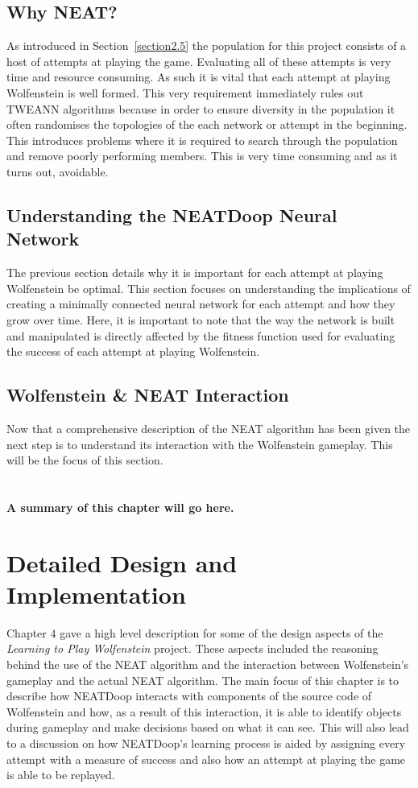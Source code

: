 \documentclass[]{Learning-to-Play-Wolfenstein-thesis}
\begin{document}
\section{Why NEAT?}
As introduced in Section~\ref{section2.5} the population for this project consists of a host of attempts at playing the game. Evaluating all of these attempts is very time and resource consuming. As such it is vital that each attempt at playing Wolfenstein is well formed. This very requirement immediately rules out TWEANN algorithms because in order to ensure diversity in the population it often randomises the topologies of the each network or attempt in the beginning. This introduces problems where it is required to search through the population and remove poorly performing members. This is very time consuming and as it turns out, avoidable.

\section{Understanding the NEATDoop Neural Network}
The previous section details why it is important for each attempt at playing Wolfenstein be optimal. This section focuses on understanding the implications of creating a minimally connected neural network for each attempt and how they grow over time. Here, it is important to note that the way the network is built and manipulated is directly affected by the fitness function used for evaluating the success of each attempt at playing Wolfenstein.

\section{Wolfenstein \& NEAT Interaction}
Now that a comprehensive description of the NEAT algorithm has been given the next step is to understand its interaction with the Wolfenstein gameplay. This will be the focus of this section. \\\\\\\textbf{A summary of this chapter will go here.}

\chapter{Detailed Design and Implementation}%
Chapter 4 gave a high level description for some of the design aspects of the \textit{Learning to Play Wolfenstein} project. These aspects included the reasoning behind the use of the NEAT algorithm and the interaction between Wolfenstein's gameplay and the actual NEAT algorithm. The main focus of this chapter is to describe how NEATDoop interacts with components of the source code of Wolfenstein and how, as a result of this interaction, it is able to identify objects during gameplay and make decisions based on what it can see. This will also lead to a discussion on how NEATDoop's learning process is aided by assigning every attempt with a measure of success and also how an attempt at playing the game is able to be replayed. 
\end{document}
